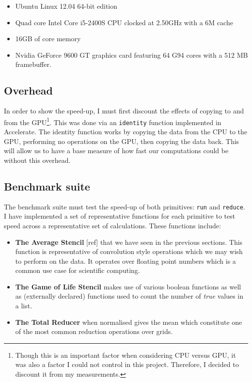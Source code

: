 \documentclass[12pt,a4paper,twoside]{scrbook}
\begin{document}
\begin{itemize}
\itemsep1pt\parskip0pt
\item
  Ubuntu Linux 12.04 64-bit edition
\item
  Quad core Intel Core i5-2400S CPU clocked at 2.50GHz with a 6M cache
\item
  16GB of core memory
\item Nvidia GeForce 9600 GT graphics card featuring 64 G94 cores with a 512 MB
  framebuffer.
\end{itemize}

\subsection{Overhead}

In order to show the speed-up, I must first discount the effects of copying to
and from the GPU\footnote{Though this is an important factor when considering
  CPU versus GPU, it was also a factor I could not control in this
  project. Therefore, I decided to discount it from my measurements.}. This was
done via an \texttt{identity} function implemented in Accelerate. The identity
function works by copying the data from the CPU to the GPU, performing no
operations on the GPU, then copying the data back. This will allow us to have a
base measure of how fast our computations could be without this overhead.

\subsection{Benchmark suite}

The benchmark suite must test the speed-up of both primitives: \texttt{run} and
\texttt{reduce}. I have implemented a set of representative functions for each
primitive to test speed across a representative set of calculations. These
functions include:

\begin{itemize}
\itemsep1pt\parskip0pt
\item
  \textbf{The Average Stencil} {[}ref{]} that we have seen in the
  previous sections. This function is representative of convolution
  style operations which we may wish to perform on the data. It operates
  over floating point numbers which is a common use case for scientific
  computing.
\item
  \textbf{The Game of Life Stencil} makes use of various boolean
  functions as well as (externally declared) functions used to count the
  number of \emph{true} values in a list.
\item \textbf{The Total Reducer} when normalised gives the mean which constitute
  one of the most common reduction operations over grids.
\end{itemize}
\end{document}
